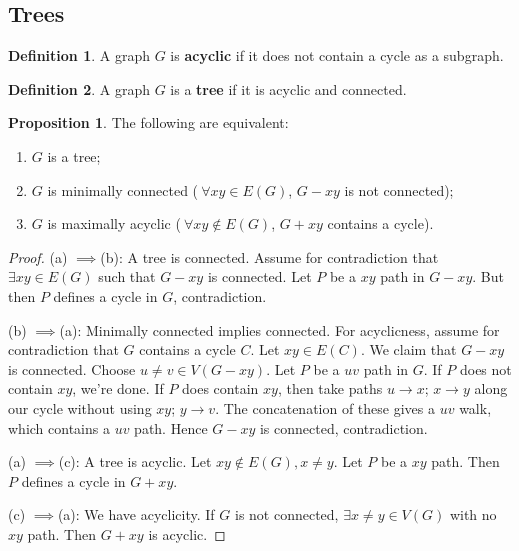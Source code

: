 \documentclass{article}
\theoremstyle{definition}
\newtheorem{prop}[theorem]{Proposition}
\newtheorem{defn}{Definition}[section]
\begin{document}
\subsection{Trees}
\begin{defn}
    A graph $G$ is \textbf{acyclic} if it does not contain a cycle as a subgraph.
\end{defn}
\begin{defn}
    A graph $G$ is a \textbf{tree} if it is acyclic and connected.
\end{defn}
\begin{prop}
    The following are equivalent:
    \begin{enumerate}
        \item $G$ is a tree;
        \item $G$ is minimally connected ($~\forall xy \in E(G)$, $G-xy$ is not connected);
        \item $G$ is maximally acyclic ($~\forall  xy \not\in E(G)$, $G+xy$ contains a cycle).
    \end{enumerate}
\end{prop}
\begin{proof}
    (a) $\implies $(b): A tree is connected. Assume for contradiction that $\exists  xy \in E(G)$ such that $G - xy$ is connected. Let $P$ be a $xy$ path in $G-xy$. But then $P$ defines a cycle in $G$, contradiction.
    \vspace{1mm}
    
    (b) $\implies $(a): Minimally connected implies connected. For acyclicness, assume for contradiction that $G$ contains a cycle $C$. Let $xy \in E(C)$. We claim that $G-xy$ is connected. Choose $u \neq v \in V(G-xy)$. Let $P$ be a $uv$ path in $G$. If $P$ does not contain $xy$, we're done. If $P$ does contain $xy$, then take paths $u \to x$; $x \to y$ along our cycle without using $xy$; $y \to v$. The concatenation of these gives a $uv$ walk, which contains a $uv$ path. Hence $G-xy$ is connected, contradiction.
    \vspace{1mm}
    
    (a) $\implies $(c): A tree is acyclic. Let $xy \not\in E(G), x\neq y$. Let $P$ be a $xy$ path. Then $P$ defines a cycle in $G+xy$.
    \vspace{1mm}
    
    (c) $\implies $(a): We have acyclicity. If $G$ is not connected, $\exists x \neq y \in V(G)$ with no $xy$ path. Then $G+xy$ is acyclic.
\end{proof}
\end{document}
